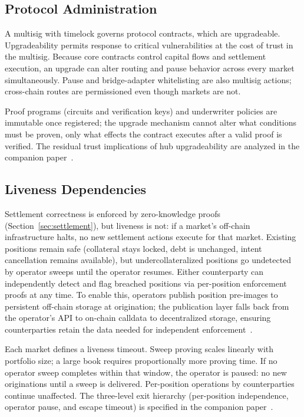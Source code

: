 \subsection{Protocol Administration}

A multisig with timelock governs protocol contracts, which are upgradeable. Upgradeability permits response to critical vulnerabilities at the cost of trust in the multisig. Because core contracts control capital flows and settlement execution, an upgrade can alter routing and pause behavior across every market simultaneously. Pause and bridge-adapter whitelisting are also multisig actions; cross-chain routes are permissioned even though markets are not.

Proof programs (circuits and verification keys) and underwriter policies are immutable once registered; the upgrade mechanism cannot alter what conditions must be proven, only what effects the contract executes after a valid proof is verified. The residual trust implications of hub upgradeability are analyzed in the companion paper~\cite{daloc-decent2026}.

\subsection{Liveness Dependencies}

Settlement correctness is enforced by zero-knowledge proofs (Section~\ref{sec:settlement}), but liveness is not: if a market's off-chain infrastructure halts, no new settlement actions execute for that market. Existing positions remain safe (collateral stays locked, debt is unchanged, intent cancellation remains available), but undercollateralized positions go undetected by operator sweeps until the operator resumes. Either counterparty can independently detect and flag breached positions via per-position enforcement proofs at any time. To enable this, operators publish position pre-images to persistent off-chain storage at origination; the publication layer falls back from the operator's API to on-chain calldata to decentralized storage, ensuring counterparties retain the data needed for independent enforcement~\cite{daloc-decent2026}.

Each market defines a liveness timeout. Sweep proving scales linearly with portfolio size; a large book requires proportionally more proving time. If no operator sweep completes within that window, the operator is paused: no new originations until a sweep is delivered. Per-position operations by counterparties continue unaffected. The three-level exit hierarchy (per-position independence, operator pause, and escape timeout) is specified in the companion paper~\cite{daloc-decent2026}.

